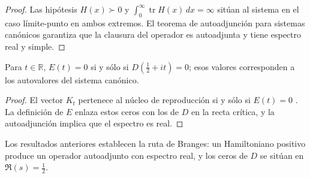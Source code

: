 \begin{proof}
Las hipótesis $H(x)\succ0$ y
$\int_0^{\infty}\operatorname{tr}H(x)\,dx=\infty$ sitúan al sistema en el caso
límite-punto en ambos extremos.  El teorema de autoadjunción para sistemas
canónicos \cite[Thm.~35]{deBranges1986} garantiza que la clausura del operador es
autoadjunta y tiene espectro real y simple.
\end{proof}

\begin{proposition}\label{prop:paper-spectrum}
Para $t\in\mathbb{R}$, $E(t)=0$ si y sólo si $D\!\left(\tfrac{1}{2}+it\right)=0$; esos
valores corresponden a los autovalores del sistema canónico.
\end{proposition}

\begin{proof}
El vector $K_t$ pertenece al núcleo de reproducción si y sólo si $E(t)=0$
\cite[Thm.~22]{deBranges1986}.  La definición de $E$ enlaza estos ceros con los
de $D$ en la recta crítica, y la autoadjunción implica que el espectro es real.
\end{proof}

Los resultados anteriores establecen la ruta de Branges: un Hamiltoniano positivo
produce un operador autoadjunto con espectro real, y los ceros de $D$ se sitúan en
$\Re(s)=\tfrac{1}{2}$.
